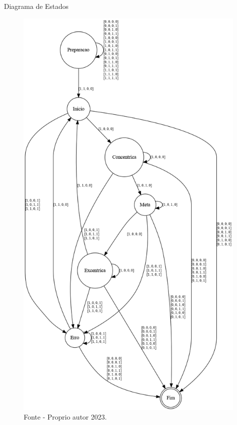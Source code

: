 \begin{frame}{Diagrama de Estados}

    \begin{figure}[!ht]
    \centering
    \includegraphics[scale=0.13]{img/desenvolvimento/estrategia/afd_barra.png}
    \caption*{Fonte - Proprio autor 2023.}
    \end{figure}
    
\end{frame}


